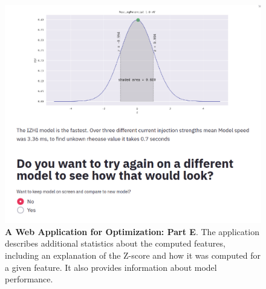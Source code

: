 \begin{figure}
\begin{center}
\includegraphics[scale=1]{figures/fixed_white_space.png}
\end{center}
\caption[Web application (5)]{\textbf{A Web Application for Optimization: Part E}.
The application describes additional statistics about the computed features, including an explanation of the Z-score and how it was computed for a given feature.
It also provides information about model performance.}
\label{fig:web-app-5}
\end{figure}
